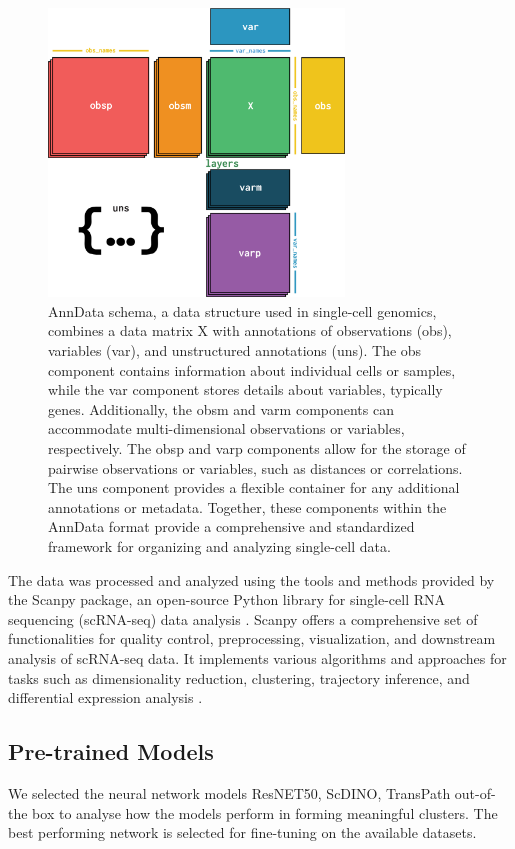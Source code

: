 \documentclass[12pt,a4paper]{article}
\begin{document}
\begin{figure}
  \centering
  \includegraphics[width=0.7\textwidth]{Figures/anndata_schema.png}
  \caption{AnnData schema, a data structure used in single-cell genomics, combines a data matrix X with annotations of observations (obs), variables (var), and unstructured annotations (uns). The obs component contains information about individual cells or samples, while the var component stores details about variables, typically genes. Additionally, the obsm and varm components can accommodate multi-dimensional observations or variables, respectively. The obsp and varp components allow for the storage of pairwise observations or variables, such as distances or correlations. The uns component provides a flexible container for any additional annotations or metadata. Together, these components within the AnnData format provide a comprehensive and standardized framework for organizing and analyzing single-cell data.}
  \label{adata}
\end{figure}

The data was processed and analyzed using the tools and methods provided by the Scanpy package, an open-source Python library for single-cell RNA sequencing (scRNA-seq) data analysis \cite{wolf_angerer_theis_2018}. Scanpy offers a comprehensive set of functionalities for quality control, preprocessing, visualization, and downstream analysis of scRNA-seq data. It implements various algorithms and approaches for tasks such as dimensionality reduction, clustering, trajectory inference, and differential expression analysis \cite{wolf_angerer_theis_2018}.

\subsection{Pre-trained Models}
We selected the neural network models ResNET50, ScDINO, TransPath out-of-the box to analyse how the models perform in forming meaningful clusters. The best performing network is selected for fine-tuning on the available datasets.
\end{document}
